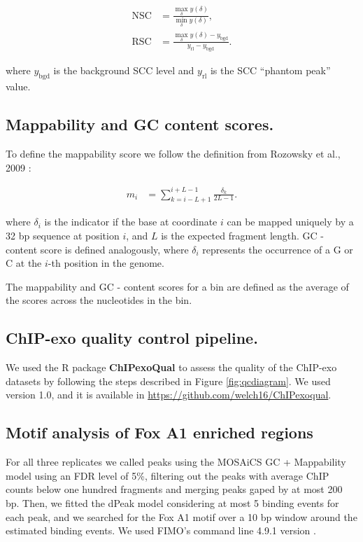 \documentclass{bmcart}\usepackage[]{graphicx}\usepackage[]{color}
\begin{document}
\begin{align}
  \mbox{NSC} &= \frac{\max_\delta y(\delta)}{\min_\delta y(\delta)}, \label{nsc} \\
  \mbox{RSC} &= \frac{\max_\delta y(\delta) -
    y_{\text{bgd}}}{y_{\text{rl}} - y_{\text{bgd}}}. \label{rsc}
\end{align}

where $y_{\text{bgd}}$ is the background SCC level and $y_{\text{rl}}$
is the SCC ``phantom peak'' value.

\subsection*{Mappability and GC content scores.}

To define the mappability score we follow the definition from Rozowsky
et al., 2009 \cite{peakseq}:

\begin{align}
  m_i &= \sum_{k = i - L +1}^{i + L - 1} \frac{\delta_k }{2L - 1}.
\end{align}

where $\delta_i$ is the indicator if the base at coordinate $i$ can be
mapped uniquely by a 32 bp sequence at position $i$, and $L$ is the
expected fragment length. GC - content score is defined analogously,
where $\delta_i$ represents the occurrence of a G or C at the $i$-th
position in the genome. 

The mappability and GC - content scores for a bin are defined as the
average of the scores across the nucleotides in the bin.

\subsection*{ChIP-exo quality control pipeline.}

We used the R package \textbf{ChIPexoQual} to assess the quality of
the ChIP-exo datasets by following the steps described in Figure
\ref{fig:qcdiagram}. We used version 1.0, and it is available in
\url{https://github.com/welch16/ChIPexoqual}.

\subsection*{Motif analysis of Fox A1 enriched regions}

For all three replicates we called peaks using the MOSAiCS GC +
Mappability model using an FDR level of 5\%, filtering out the peaks
with average ChIP counts below one hundred fragments and merging peaks
gaped by at most 200 bp. Then, we fitted the dPeak model considering
at most 5 binding events for each peak, and we searched for the Fox A1
motif over a 10 bp window around the estimated binding events. We used
FIMO's command line 4.9.1 version \cite{fimo}.
\end{document}
